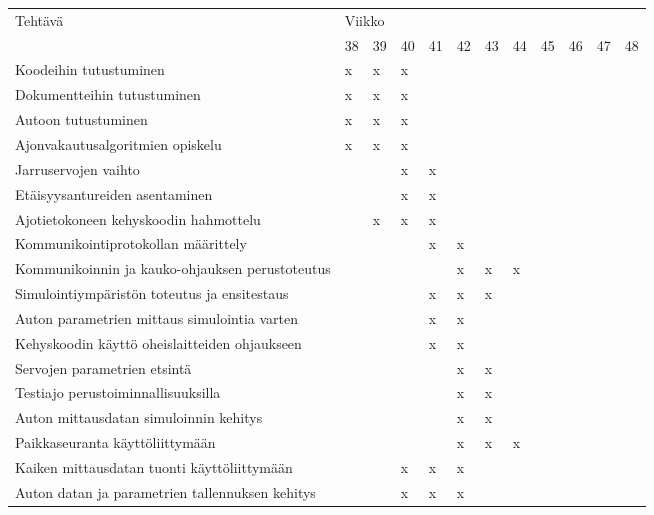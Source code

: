 \documentclass{article}
\begin{document}
\begin{figure}[H]
	\begin{tabular}{l|l|l|l|l|l|l|l|l|l|l|l|}
		Tehtävä & \multicolumn{10}{l}{Viikko} \\
		& 38 & 39 & 40 & 41 & 42 & 43 & 44 & 45 & 46 & 47 & 48 \\
		\hline

		Koodeihin tutustuminen
		& x & x & x &   &   &   &   &   &   &   &   \\
		Dokumentteihin tutustuminen
		& x & x & x &   &   &   &   &   &   &   &   \\
		Autoon tutustuminen
		& x & x & x &   &   &   &   &   &   &   &   \\
		Ajonvakautusalgoritmien opiskelu
		& x & x & x &   &   &   &   &   &   &   &   \\
		Jarruservojen vaihto
		&   &   & x & x &   &   &   &   &   &   &   \\
		Etäisyysantureiden asentaminen
		&   &   & x & x &   &   &   &   &   &   &   \\
		Ajotietokoneen kehyskoodin hahmottelu
		&   & x & x & x &   &   &   &   &   &   &   \\
		Kommunikointiprotokollan määrittely
		&   &   &   & x & x &   &   &   &   &   &   \\
		Kommunikoinnin ja kauko-ohjauksen perustoteutus
		&   &   &   &   & x & x & x &   &   &   &   \\
		Simulointiympäristön toteutus ja ensitestaus
		&   &   &   & x & x & x &   &   &   &   &   \\
		Auton parametrien mittaus simulointia varten
		&   &   &   & x & x &   &   &   &   &   &   \\
		Kehyskoodin käyttö oheislaitteiden ohjaukseen
		&   &   &   & x & x &   &   &   &   &   &   \\
		Servojen parametrien etsintä
		&   &   &   &   & x & x &   &   &   &   &   \\
		Testiajo perustoiminnallisuuksilla
		&   &   &   &   & x & x &   &   &   &   &   \\
		Auton mittausdatan simuloinnin kehitys
		&   &   &   &   & x & x &   &   &   &   &   \\
		Paikkaseuranta käyttöliittymään
		&   &   &   &   & x & x & x &   &   &   &   \\
		Kaiken mittausdatan tuonti käyttöliittymään
		&   &   & x & x & x &   &   &   &   &   &   \\
		Auton datan ja parametrien tallennuksen kehitys
		&   &   & x & x & x &   &   &   &   &   &   \\

\end{tabular}
\end{figure}
\end{document}
